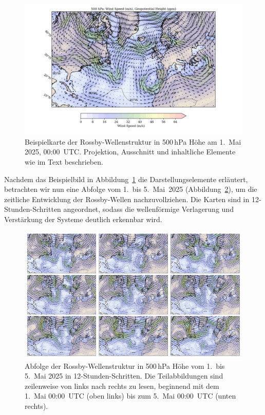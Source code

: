 \begin{figure}
	\centering
	\includegraphics[width=\textwidth, trim=2cm 0cm 3cm 0cm, clip]{papers/rossby/images/data_2025_5_1_00_00_500.jpg}
	\caption{Beispielkarte der Rossby-Wellenstruktur in 500\,hPa Höhe am 1.\ Mai 2025, 00:00~UTC.
		Projektion, Ausschnitt und inhaltliche Elemente wie im Text beschrieben.}
	\label{fig:rossby_atlantic_single}
\end{figure}

Nachdem das Beispielbild in Abbildung~\ref{fig:rossby_atlantic_single} die
Darstellungselemente erläutert, betrachten wir nun eine Abfolge vom 1.\ bis 5.\ Mai~2025
(Abbildung~\ref{fig:rossby_grid}), um die zeitliche Entwicklung der Rossby-Wellen
nachzuvollziehen. Die Karten sind in 12-Stunden-Schritten angeordnet, sodass die
wellenförmige Verlagerung und Verstärkung der Systeme deutlich erkennbar wird.


\begin{figure}
	\centering
	\includegraphics[width=\textwidth]{papers/rossby/images/rossby_2025.pdf}
	\caption{Abfolge der Rossby-Wellenstruktur in 500\,hPa Höhe vom 1.\ bis 5.\ Mai 2025 in 12-Stunden-Schritten.
		Die Teilabbildungen sind zeilenweise von links nach rechts zu lesen, beginnend mit dem 1.\ Mai 00:00~UTC (oben links)
		bis zum 5.\ Mai 00:00~UTC (unten rechts).}
	\label{fig:rossby_grid}
\end{figure}

